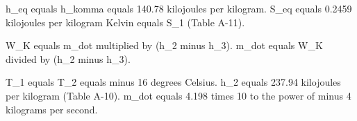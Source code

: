 h_eq equals h_komma equals 140.78 kilojoules per kilogram.  
S_eq equals 0.2459 kilojoules per kilogram Kelvin equals S_1 (Table A-11).  

W_K equals m_dot multiplied by (h_2 minus h_3).  
m_dot equals W_K divided by (h_2 minus h_3).  

T_1 equals T_2 equals minus 16 degrees Celsius.  
h_2 equals 237.94 kilojoules per kilogram (Table A-10).  
m_dot equals 4.198 times 10 to the power of minus 4 kilograms per second.